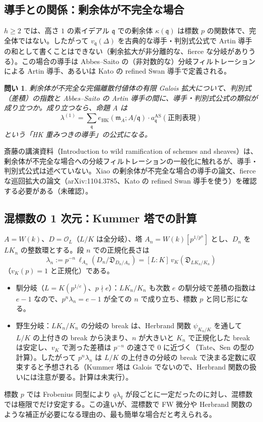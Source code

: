\documentclass[11pt,a4paper]{ltjsarticle}
\theoremstyle{plain}
\newtheorem{question}{問い}
\theoremstyle{definition}
\theoremstyle{remark}
\theoremstyle{plain}
\newcommand{\m}{\mathfrak{m}}
\newcommand{\eHK}{e_{\mathrm{HK}}}
\begin{document}
\subsection{導手との関係：剰余体が不完全な場合}
$h\ge2$ では、高さ $1$ の素イデアル $\mathfrak{q}$ での剰余体 $\kappa(\mathfrak{q})$ は標数 $p$ の関数体で、完全体ではない。したがって $v_\mathfrak{q}(\Delta)$ を古典的な導手・判別式公式で Artin 導手の和として書くことはできない（剰余拡大が非分離的な、fierce な分岐がありうる）。この場合の導手は Abbes--Saito の（非対数的な）分岐フィルトレーションによる Artin 導手、あるいは Kato の refined Swan 導手で定義される。
\begin{question}
剰余体が不完全な完備離散付値体の有限 Galois 拡大について、判別式（差積）の指数と Abbes--Saito の Artin 導手の間に、導手・判別式公式の類似が成り立つか。成り立つなら、命題 A は
\[
  \lambda^{(1)} = \sum_{\mathfrak{q}}\eHK(\m_A;A/\mathfrak{q})\cdot a^{\mathrm{AS}}_\mathfrak{q}(\text{正則表現})
\]
という「HK 重みつきの導手」の公式になる。
\end{question}
斎藤の講演資料（Introduction to wild ramification of schemes and sheaves）は、剰余体が不完全な場合への分岐フィルトレーションの一般化に触れるが、導手・判別式公式は述べていない。Xiao の剰余体が不完全な場合の導手の論文、fierce な巡回拡大の論文（arXiv:1104.3785、Kato の refined Swan 導手を使う）を確認する必要がある（未確認）。

\subsection{混標数の 1 次元：Kummer 塔での計算}
$A = W(k)$、$D = \mathcal{O}_L$（$L/K$ は全分岐）、塔 $A_n = W(k)[p^{1/p^n}]$ とし、$D_n$ を $LK_n$ の整数環とする。段 $n$ での正規化長さは
\[
  \lambda_n := p^{-n}\,\ell_{A_n}(D_n/\mathfrak{D}_{D_n/A_n}) = [L:K]\,v_K(\mathfrak{D}_{LK_n/K_n})
\]
（$v_K(p) = 1$ と正規化）である。
\begin{itemize}
  \item 馴分岐（$L = K(p^{1/e})$、$p\nmid e$）：$LK_n/K_n$ も次数 $e$ の馴分岐で差積の指数は $e-1$ なので、$p^n\lambda_n = e-1$ が全ての $n$ で成り立ち、標数 $p$ と同じ形になる。
  \item 野生分岐：$LK_n/K_n$ の分岐の break は、Herbrand 関数 $\psi_{K_n/K}$ を通して $L/K$ の上付きの break から決まり、$n$ が大きいと $K_n$ で正規化した break は安定し、$v_K$ で測った差積は $p^{-n}$ の速さで $0$ に近づく（Tate、Sen の型の計算）。したがって $p^n\lambda_n$ は $L/K$ の上付きの分岐の break で決まる定数に収束すると予想される（Kummer 塔は Galois でないので、Herbrand 関数の扱いには注意が要る。計算は未実行）。
\end{itemize}
標数 $p$ では Frobenius 同型により $q\lambda_q$ が段ごとに一定だったのに対し、混標数では極限でだけ安定する。この違いが、混標数で FW 微分や Herbrand 関数のような補正が必要になる理由の、最も簡単な場合だと考えられる。
\end{document}
